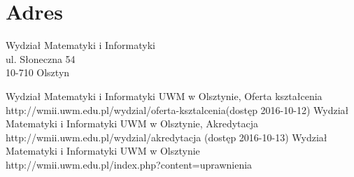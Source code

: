 ﻿\documentclass[a4paper,12pt]{article}
\begin{document}
\section{Adres}
\begin{center}
Wydział Matematyki i Informatyki\\
ul. Słoneczna 54\\
10-710 Olsztyn	
\end{center}


\begin{thebibliography}{1}

 Wydział Matematyki i Informatyki UWM w Olsztynie, Oferta kształcenia http://wmii.uwm.edu.pl/wydzial/oferta-ksztalcenia\newline (dostęp 2016-10-12)
 Wydział Matematyki i Informatyki UWM w Olsztynie, Akredytacja http://wmii.uwm.edu.pl/wydzial/akredytacja (dostęp 2016-10-13)
 Wydział Matematyki i Informatyki UWM w Olsztynie http://wmii.uwm.edu.pl/index.php?content=uprawnienia

\end{thebibliography}
\end{document}
